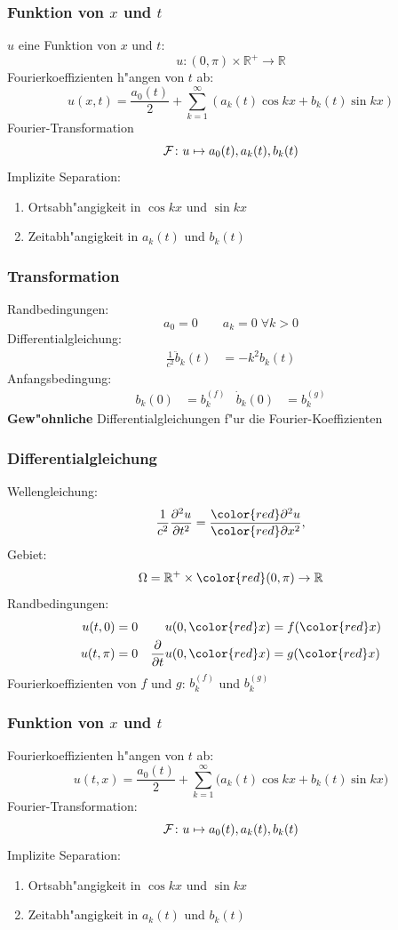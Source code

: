 \documentclass[handout]{beamer}
\begin{document}
\begin{frame}
\frametitle{Funktion von $x$ und $t$}

$u$ eine Funktion von $x$ und $t$:
\[
u\colon (0,\pi)\times \mathbb R^+\to \mathbb R
\]
Fourierkoeffizienten h"angen von $t$ ab:
\[
u(x,t)=\frac{a_0(t)}2+\sum_{k=1}^\infty (a_k(t)\cos kx+b_k(t)\sin kx)
\]
Fourier-Transformation
\[
{\cal F}\colon
u\mapsto
a_0(t), a_k(t), b_k(t)
\]
\pause
Implizite Separation:
\begin{enumerate}[<+->]
\item Ortsabh"angigkeit in $\cos kx$ und $\sin kx$
\item Zeitabh"angigkeit in $a_k(t)$ und $b_k(t)$
\end{enumerate}

\end{frame}

\begin{frame}
\frametitle{Transformation}
Randbedingungen:
\[
a_0=0\qquad
a_k=0\;\forall k > 0
\]
Differentialgleichung:
\begin{align*}
\frac{1}{c^2}\ddot b_k(t)&= -k^2b_k(t)
\end{align*}
Anfangsbedingung:
\begin{align*}
b_k(0)&= b_k^{(f)}& \dot b_k(0)&=b_k^{(g)}
\end{align*}
{\bf Gew"ohnliche} Differentialgleichungen f"ur die Fourier-Koeffizienten
\end{frame}

\begin{frame}
\frametitle{Differentialgleichung}

Wellengleichung:
\[
\frac{1}{c^2}
\frac{\partial^2 u}{\partial t^2}
=
\frac{{\color{red}\partial^2} u}{{\color{red}\partial x^2}},
\]
Gebiet:
\[
\Omega = \mathbb R^+ \times {\color{red}(0,\pi)} \to \mathbb R
\]
Randbedingungen:
\begin{align*}
u(t,   0)&= 0&u(0,{\color{red}x})&=f({\color{red}x})\\
u(t, \pi)&= 0&\frac{\partial}{\partial t}u(0,{\color{red}x})&=g({\color{red}x})
\end{align*}
Fourierkoeffizienten von $f$ und $g$: $b_k^{(f)}$ und $b^{(g)}_k$

\end{frame}

\begin{frame}
\frametitle{Funktion von $x$ und $t$}

Fourierkoeffizienten h"angen von $t$ ab:
\[
u(t,x)=\frac{a_0(t)}2+\sum_{k=1}^\infty \bigl(a_k(t)\cos kx+b_k(t)\sin kx\bigr)
\]
Fourier-Transformation:
\[
{\cal F}\colon
u\mapsto
a_0(t), a_k(t), b_k(t)
\]
Implizite Separation:
\begin{enumerate}
\item Ortsabh"angigkeit in $\cos kx$ und $\sin kx$
\item Zeitabh"angigkeit in $a_k(t)$ und $b_k(t)$
\end{enumerate}

\end{frame}
\end{document}
